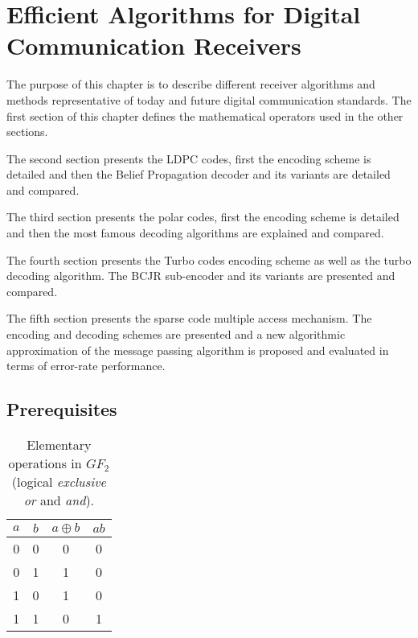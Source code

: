
\graphicspath{{main/chapter2/fig/}}

\chapter{Efficient Algorithms for Digital Communication Receivers}
\label{chap:alg}

The purpose of this chapter is to describe different receiver algorithms and
methods representative of today and future digital communication standards.
The first section of this chapter defines the mathematical operators used in the
other sections.

The second section presents the LDPC codes, first the encoding scheme is
detailed and then the Belief Propagation decoder and its variants are detailed
and compared.

The third section presents the polar codes, first the encoding scheme is
detailed and then the most famous decoding algorithms are explained and
compared.

The fourth section presents the Turbo codes encoding scheme as well as the turbo
decoding algorithm. The BCJR sub-encoder and its variants are presented and
compared.

The fifth section presents the sparse code multiple access mechanism. The
encoding and decoding schemes are presented and a new algorithmic approximation
of the message passing algorithm is proposed and evaluated in terms of
error-rate performance.

\vspace*{\fill}
\minitoccustom
\vspace*{\fill}

\section{Prerequisites}

\begin{table}[htp]
  \centering
  \caption{Elementary operations in $GF_2$ (logical \emph{exclusive or} and
    \emph{and}).}
  \label{tab:alg_gf2_operations}
   \begin{tabular}{c c c c}
   $a$ & $b$ & $a \oplus b$ & $ab$ \\
    \hline
    \hline
    0 & 0 & 0 & 0 \\
    0 & 1 & 1 & 0 \\
    1 & 0 & 1 & 0 \\
    1 & 1 & 0 & 1 \\
  \end{tabular}
\end{table}


